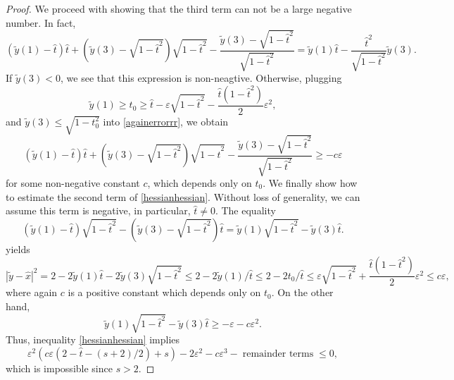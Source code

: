 \documentclass[12pt]{amsart}
\theoremstyle{definition}
\def\ep{\varepsilon}
\newcommand{\1}{\mathbf{1}}
\begin{document}
\begin{proof}
We proceed with showing that the third term can not be a large negative number. In fact,
\begin{equation}\label{againerrorrr}
(\tilde{y}(1)-\hat t)\hat{t}+(\tilde{y}(3)-\sqrt{1-\hat{t}^2})\sqrt{1-\hat t^2} - \frac{\tilde{y}(3)-\sqrt{1-\hat{t}^2}}{\sqrt{1-\hat{t}^2}}=\tilde{y}(1)\hat{t}-\frac{\hat{t}^2}{\sqrt{1-\hat{t}^2}}\tilde{y}(3).
\end{equation}
If $\tilde{y}(3)< 0$, we see that this expression is non-neagtive. Otherwise, plugging
$$
\tilde{y}(1)\geqslant t_0\geqslant \hat{t}-\ep \sqrt{1-\hat{t}^2}-\frac{\hat t(1-\hat{t}^2)}2\ep^2,
$$
and $\tilde{y}(3)\leqslant \sqrt{1-t_0^2}$ into \eqref{againerrorrr}, we obtain
$$
(\tilde{y}(1)-\hat t)\hat{t}+(\tilde{y}(3)-\sqrt{1-\hat{t}^2})\sqrt{1-\hat t^2} - \frac{\tilde{y}(3)-\sqrt{1-\hat{t}^2}}{\sqrt{1-\hat{t}^2}} \geqslant -c\ep
$$
for some non-negative constant $c$, which depends only on $t_0$. 
We finally show how to estimate the second term of \eqref{hessianhessian}. Without loss of generality, we can assume this term is negative, in particular, $\hat{t}\not = 0$. The equality
$$
(\tilde{y}(1)-\hat t)\sqrt{1-\hat t^2}-(\tilde{y}(3)-\sqrt{1-\hat t^2})\hat{t} = \tilde{y}(1)\sqrt{1-\hat{t}^2}-\tilde{y}(3)\hat{t}.
$$
yields
$$
|\tilde{y}-\hat{x}|^2 = 2-2\tilde{y}(1)\hat t-2\tilde{y}(3)\sqrt{1-\hat{t}^2} \leqslant 2-2\tilde{y}(1)/\hat{t} \leqslant 2-2t_0/\hat{t} \leqslant \ep\sqrt{1-\hat{t}^2}+\frac{\hat{t}(1-\hat{t}^2)}2\ep^2 \leqslant c\ep,
$$
where again $c$ is a positive constant which depends only on $t_0$. 
On the other hand, 
$$
\tilde{y}(1)\sqrt{1-\hat{t}^2}-\tilde{y}(3)\hat{t}\geqslant -\ep - c\ep^2.
$$
Thus, inequality \eqref{hessianhessian} implies
$$
\ep^2(c\ep(2-\hat{t}-(s+2)/2)+s)-2\ep^2 -c\ep^3 - \; \mbox{remainder terms} \; \leqslant 0,
$$
which is impossible since $s>2$. 
\end{proof}

\end{document}

